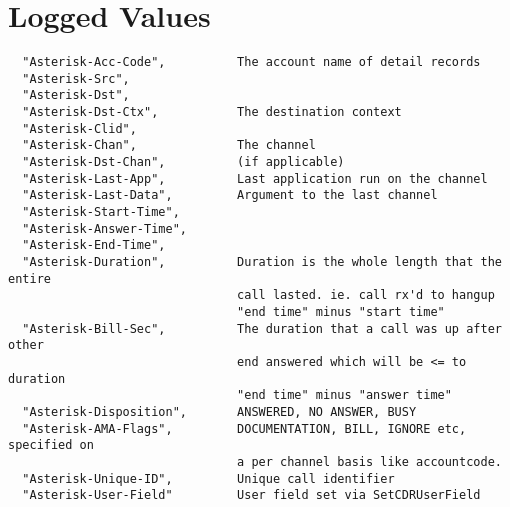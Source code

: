 \section{Logged Values}
\begin{verbatim}
  "Asterisk-Acc-Code",          The account name of detail records
  "Asterisk-Src",
  "Asterisk-Dst",
  "Asterisk-Dst-Ctx",           The destination context
  "Asterisk-Clid",
  "Asterisk-Chan",              The channel
  "Asterisk-Dst-Chan",	        (if applicable)
  "Asterisk-Last-App",	        Last application run on the channel 
  "Asterisk-Last-Data",         Argument to the last channel 
  "Asterisk-Start-Time",        
  "Asterisk-Answer-Time", 
  "Asterisk-End-Time", 
  "Asterisk-Duration",          Duration is the whole length that the entire 
                                call lasted. ie. call rx'd to hangup 
                                "end time" minus "start time" 
  "Asterisk-Bill-Sec", 	        The duration that a call was up after other 
                                end answered which will be <= to duration  
                                "end time" minus "answer time" 
  "Asterisk-Disposition",    	ANSWERED, NO ANSWER, BUSY 
  "Asterisk-AMA-Flags",       	DOCUMENTATION, BILL, IGNORE etc, specified on 
                                a per channel basis like accountcode. 
  "Asterisk-Unique-ID",         Unique call identifier 
  "Asterisk-User-Field"	        User field set via SetCDRUserField 
\end{verbatim}
